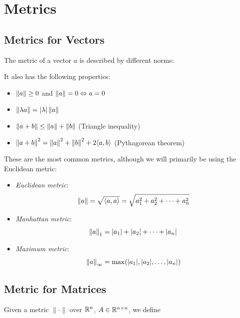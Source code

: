 \chapter{Metrics}

\section{Metrics for Vectors}

The metric of a vector \(a\) is described by different norms:

It also has the following properties:

\begin{itemize}

	\item \(\left\| a \right\| \geq 0\) and \(\left\| a \right\| = 0 \Leftrightarrow a = 0\)

	\item \(\left\| \lambda a \right\| = |\lambda| \left\| a \right\|\)

	\item \(\left\| a + b \right\| \leq \left\| a \right\| + \left\| b \right\|\) (Triangle inequality)

	\item \(\left\| a + b \right\|^2 = \left\| a \right\|^2 + \left\| b \right\|^2 + 2\langle a, b\rangle\) (Pythagorean theorem)

\end{itemize}

These are the most common metrics, although we will primarily be using the Euclidean metric:

\begin{itemize}

	\item \emph{Euclidean metric}:
	      \[
		      \left\| a \right\| = \sqrt{\langle a, a\rangle} = \sqrt{a_1^2 + a_2^2 + \cdots + a_n^2}
	      \]
	\item \emph{Manhattan metric}:
	      \[
		      \left\| a \right\|_1 = |a_1| + |a_2| + \cdots + |a_n|
	      \]
	\item \emph{Maximum metric}:
	      \[
		      \left\| a \right\|_\infty = \max(|a_1|, |a_2|, \dots , |a_n|)
	      \]
\end{itemize}

\section{Metric for Matrices}

Given a metric \(\|\cdot\|\) over \(\mathbb{R}^n\), \(A \in \mathbb{R}^{n \times n}\), we define 

